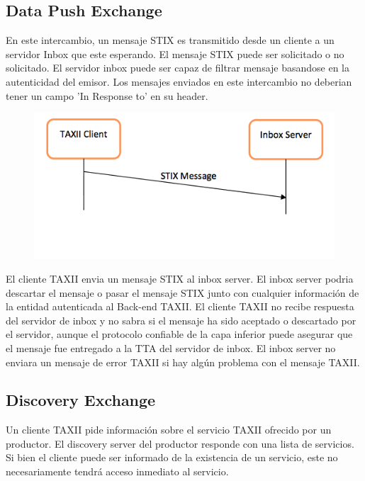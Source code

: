 \subsection{Data Push Exchange}
En este intercambio, un mensaje STIX es transmitido desde un cliente a un 
servidor Inbox que este esperando. El mensaje STIX puede ser solicitado o no 
solicitado. El servidor inbox puede ser capaz de filtrar mensaje basandose en la 
autenticidad del emisor. Los mensajes enviados en este intercambio no deberian 
tener un campo 'In Response to' en su header.

\begin{figure}[ht!]
  \centering
    \includegraphics[width=150mm]{./Figures/DataPushExchange.png}
\end{figure}

El cliente TAXII envia un mensaje STIX al inbox server. El inbox server podria 
descartar el mensaje o pasar el mensaje STIX junto con cualquier información de 
la entidad autenticada al Back-end TAXII. El cliente TAXII no recibe respuesta 
del servidor de inbox y no sabra si el mensaje ha sido aceptado o descartado por 
el servidor, aunque el protocolo confiable de la capa inferior puede asegurar 
que el mensaje fue entregado a la TTA del servidor de inbox. El inbox server no 
enviara un mensaje de error TAXII si hay algún problema con el mensaje TAXII.

\subsection{Discovery Exchange}
Un cliente TAXII pide información sobre el servicio TAXII ofrecido por un 
productor. El discovery server del productor responde con una lista de 
servicios. Si bien el cliente puede ser informado de la existencia de un 
servicio, este no necesariamente tendrá acceso inmediato al servicio.

